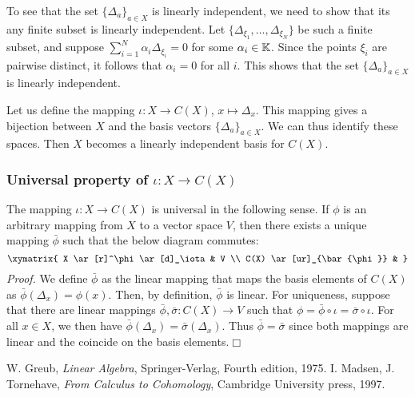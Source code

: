 \documentclass[12pt]{article}
\begin{document}
To see that the set $\{ \Delta_a\}_{a\in X}$ is linearly independent, 
we need to show that its any finite subset is linearly independent. 
Let $\{ \Delta_{\xi_1}, \ldots, \Delta_{\xi_N} \}$ be such
a finite subset, and  
suppose $\sum_{i=1}^N \alpha_i \Delta_{\xi_i }=0$ for some 
$\alpha_i \in \mathbb{K}$. Since the points $\xi_i$ are pairwise distinct, it 
follows that $\alpha_i=0$ for all $i$. This shows that the set
 $\{ \Delta_a\}_{a\in X}$ is linearly independent. 

Let us define the mapping $\iota:X\to C(X)$, $x\mapsto \Delta_x$.
This mapping gives a bijection between $X$ and the basis
vectors $\{ \Delta_a\}_{a\in X}$. We can thus identify these
spaces. Then  $X$ becomes a linearly independent basis for $C(X)$.

\subsubsection{Universal property of $\iota:X\to C(X)$} 
The mapping $\iota:X\to C(X)$ is universal in
the following sense. If $\phi$ is an arbitrary mapping from $X$ to a
vector space $V$, then there exists a unique mapping $\bar{\phi}$
such that the below diagram commutes:
$$
\xymatrix{
X \ar[r]^\phi\ar[d]_\iota & V \\
C(X) \ar[ur]_{\bar{\phi}} &
}
$$
\emph{Proof.} We define $\bar{\phi}$ as the linear mapping that
maps the basis elements of $C(X)$ as $\bar{\phi}(\Delta_x) = \phi(x)$.
Then, by definition, $\bar{\phi}$ is linear. For uniqueness,
suppose that there are linear mappings
$\bar{\phi},\bar{\sigma}:C(X)\to V$
such that $\phi=\bar{\phi}\circ \iota =\bar{\sigma}\circ \iota$.
For all $x\in X$, we then have $\bar{\phi}(\Delta_x)=\bar{\sigma}(\Delta_x)$.
Thus $\bar{\phi}=\bar{\sigma}$ since  both mappings are linear and
the coincide on the basis elements.$\Box$ 

\begin{thebibliography}{9}
W. Greub,
\emph{Linear Algebra},
Springer-Verlag, Fourth edition, 1975.
I. Madsen, J. Tornehave,
\emph{From Calculus to Cohomology},
Cambridge University press,
1997.
\end{thebibliography}
\end{document}
